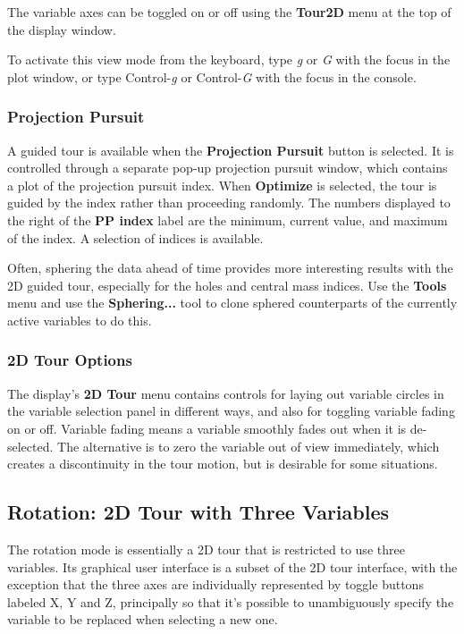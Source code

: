 \documentclass[11pt]{article}
\def\Widget#1{\textbf{#1}}
\begin{document}
The variable axes can be toggled on or off using the \Widget{Tour2D}
menu at the top of the display window.

To activate this view mode from the keyboard, type {\em g} or {\em G}
with the focus in the plot window, or type Control-{\em g} or
Control-{\em G} with the focus in the console.

\subsubsection{Projection Pursuit}

A guided tour is available when the \Widget{Projection Pursuit} button is
selected. It is controlled through a separate pop-up projection
pursuit window, which contains a plot of the projection pursuit index.
When \Widget{Optimize} is selected, the tour is guided by the index
rather than proceeding randomly.  The numbers displayed to the right
of the \Widget{PP index} label are the minimum, current value, and
maximum of the index.  A selection of indices is available.

Often, sphering the data ahead of time provides more interesting
results with the 2D guided tour, especially for the holes and central
mass indices. Use the \Widget{Tools} menu and use the
\Widget{Sphering...}  tool to clone sphered counterparts of the
currently active variables to do this.

\subsubsection{2D Tour Options}

The display's \Widget{2D Tour} menu contains controls for laying out
variable circles in the variable selection panel in different ways,
and also for toggling variable fading on or off. Variable fading means
a variable smoothly fades out when it is de-selected. The alternative
is to zero the variable out of view immediately, which creates a
discontinuity in the tour motion, but is desirable for some
situations.

\subsection{Rotation: 2D Tour with Three Variables}
\label{slbl:Rotation}

The rotation mode is essentially a 2D tour that is restricted to use
three variables.  Its graphical user interface is a subset of the 2D
tour interface, with the exception that the three axes are
individually represented by toggle buttons labeled X,
Y and Z, principally so that it's possible to
unambiguously specify the variable to be replaced when selecting a new
one.
\end{document}
